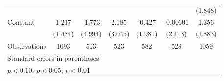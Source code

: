 \begin{table}[htbp]
\begin{tabular}{l*{6}{c}}
                    &                     &                     &                     &                     &                     &     (1.848)         \\
\addlinespace
Constant            &       1.217         &      -1.773         &       2.185         &      -0.427         &    -0.00601         &       1.356         \\
                    &     (1.484)         &     (4.994)         &     (3.045)         &     (1.981)         &     (2.173)         &     (1.883)         \\
\midrule
Observations        &        1093         &         503         &         523         &         582         &         528         &        1059         \\
\bottomrule
\multicolumn{7}{l}{\footnotesize Standard errors in parentheses}\\
\multicolumn{7}{l}{\footnotesize \sym{*} \(p<0.10\), \sym{**} \(p<0.05\), \sym{***} \(p<0.01\)}\\
\end{tabular}
\end{table}
